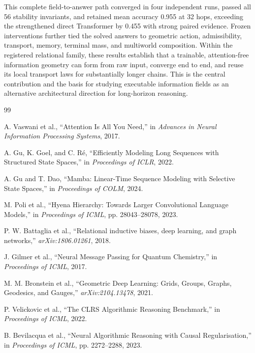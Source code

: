 \documentclass[11pt]{article}
\begin{document}
This complete field-to-answer path converged in four independent runs, passed
all 56 stability invariants, and retained mean accuracy 0.955 at 32 hops,
exceeding the strengthened direct Transformer by 0.455 with strong paired
evidence. Frozen interventions further tied the solved answers to geometric
action, admissibility, transport, memory, terminal mass, and multiworld
composition. Within the registered relational family, these results establish
that a trainable, attention-free information geometry can form from raw input,
converge end to end, and reuse its local transport laws for substantially
longer chains. This is the central contribution and the basis for studying
executable information fields as an alternative architectural direction for
long-horizon reasoning.

\begin{thebibliography}{99}

A. Vaswani et al., ``Attention Is All You Need,'' in \emph{Advances in Neural
Information Processing Systems}, 2017.

A. Gu, K. Goel, and C. R\'e, ``Efficiently Modeling Long Sequences with
Structured State Spaces,'' in \emph{Proceedings of ICLR}, 2022.

A. Gu and T. Dao, ``Mamba: Linear-Time Sequence Modeling with Selective State
Spaces,'' in \emph{Proceedings of COLM}, 2024.

M. Poli et al., ``Hyena Hierarchy: Towards Larger Convolutional Language
Models,'' in \emph{Proceedings of ICML}, pp. 28043--28078, 2023.

P. W. Battaglia et al., ``Relational inductive biases, deep learning, and graph
networks,'' \emph{arXiv:1806.01261}, 2018.

J. Gilmer et al., ``Neural Message Passing for Quantum Chemistry,'' in
\emph{Proceedings of ICML}, 2017.

M. M. Bronstein et al., ``Geometric Deep Learning: Grids, Groups, Graphs,
Geodesics, and Gauges,'' \emph{arXiv:2104.13478}, 2021.

P. Velickovic et al., ``The CLRS Algorithmic Reasoning Benchmark,'' in
\emph{Proceedings of ICML}, 2022.

B. Bevilacqua et al., ``Neural Algorithmic Reasoning with Causal
Regularisation,'' in \emph{Proceedings of ICML}, pp. 2272--2288, 2023.


\end{thebibliography}
\end{document}
